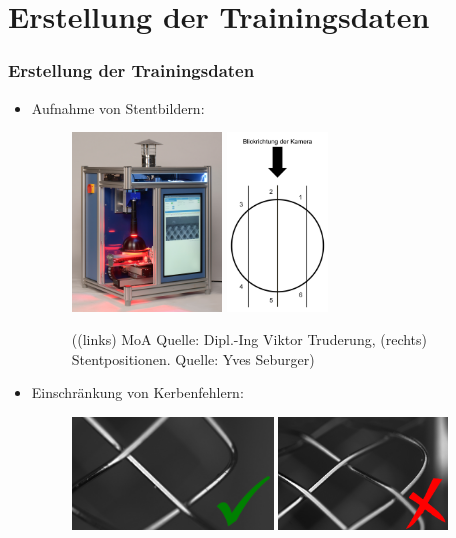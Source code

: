 \documentclass{beamer}
\begin{document}
\section{Erstellung der Trainingsdaten}
\begin{frame}[allowframebreaks]
\frametitle{Erstellung der Trainingsdaten}
\begin{itemize}
    \item Aufnahme von Stentbildern:
        \begin{figure}
            \includegraphics[height=4.75cm]{Bilder/MoA_Gesa_preversion_cut.jpg}
            \hspace{20px}
            \includegraphics[height=4.75cm]{Bilder/Stentpositionen.png}
            \caption{((links) MoA Quelle: Dipl.-Ing Viktor Truderung, (rechts) Stentpositionen. \scriptsize{Quelle: Yves Seburger})}
        \end{figure}
\end{itemize}
\begin{itemize}
    \item Einschränkung von Kerbenfehlern:
        \begin{figure}
            \includegraphics[height=3.0cm]{Bilder/Annotationfragen/Kerbe.jpg}
            \includegraphics[height=3.0cm]{Bilder/Annotationfragen/Kratzer.jpg}

\end{figure}
\end{itemize}
\end{frame}
\end{document}
